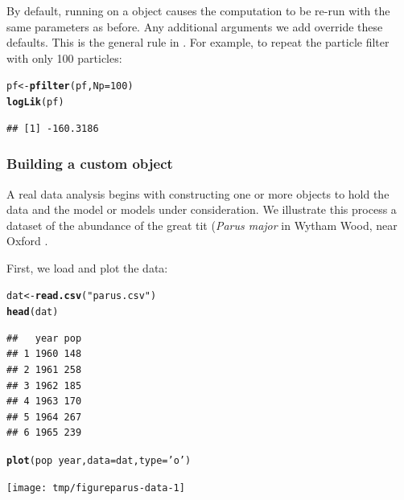 \documentclass{beamer}\usepackage[]{graphicx}\usepackage[]{color}
\makeatletter
\newcommand{\hlnum}[1]{\textcolor[rgb]{0.686,0.059,0.569}{#1}}%
\newcommand{\hlstr}[1]{\textcolor[rgb]{0.192,0.494,0.8}{#1}}%
\newcommand{\hlopt}[1]{\textcolor[rgb]{0,0,0}{#1}}%
\newcommand{\hlstd}[1]{\textcolor[rgb]{0.345,0.345,0.345}{#1}}%
\newcommand{\hlkwb}[1]{\textcolor[rgb]{0.69,0.353,0.396}{#1}}%
\newcommand{\hlkwc}[1]{\textcolor[rgb]{0.333,0.667,0.333}{#1}}%
\newcommand{\hlkwd}[1]{\textcolor[rgb]{0.737,0.353,0.396}{\textbf{#1}}}%
\newenvironment{kframe}{%
 \def\at@end@of@kframe{}%
 \ifinner\ifhmode%
  \def\at@end@of@kframe{\end{minipage}}%
  \begin{minipage}{\columnwidth}%
 \fi\fi%
 \def\FrameCommand##1{\hskip\@totalleftmargin \hskip-\fboxsep
 \colorbox{shadecolor}{##1}\hskip-\fboxsep
     \hskip-\linewidth \hskip-\@totalleftmargin \hskip\columnwidth}%
 \MakeFramed {\advance\hsize-\width
   \@totalleftmargin\z@ \linewidth\hsize
   \@setminipage}}%
 {\par\unskip\endMakeFramed%
 \at@end@of@kframe}
\newenvironment{knitrout}{}{} %
\makeatother
\begin{document}
\begin{frame}[fragile]
\item By default, running  on a  object causes the computation to be re-run with the same parameters as before.
Any additional arguments we add override these defaults.
This is the general rule in .
For example, to repeat the particle filter with only 100 particles:
\ei
\begin{knitrout}\small
{}\color{fgcolor}\begin{kframe}
\begin{alltt}
\hlstd{pf} \hlkwb{<-} \hlkwd{pfilter}\hlstd{(pf,}\hlkwc{Np}\hlstd{=}\hlnum{100}\hlstd{)}
\hlkwd{logLik}\hlstd{(pf)}
\end{alltt}
\begin{verbatim}
## [1] -160.3186
\end{verbatim}
\end{kframe}
\end{knitrout}

\end{frame}    

\begin{frame}[fragile] 
\frametitle{Building a custom  object}

A real  data analysis begins with constructing one or more  objects to hold the data and the model or models under consideration.
We illustrate this process a dataset of the abundance of the great tit ({\it Parus major} in Wytham Wood, near Oxford \citep{mccleery91}.

First, we load and plot the data:
\begin{knitrout}\small
{}\color{fgcolor}\begin{kframe}
\begin{alltt}
\hlstd{dat} \hlkwb{<-} \hlkwd{read.csv}\hlstd{(}\hlstr{"parus.csv"}\hlstd{)}
\hlkwd{head}\hlstd{(dat)}
\end{alltt}
\begin{verbatim}
##   year pop
## 1 1960 148
## 2 1961 258
## 3 1962 185
## 4 1963 170
## 5 1964 267
## 6 1965 239
\end{verbatim}
\begin{alltt}
\hlkwd{plot}\hlstd{(pop}\hlopt{~}\hlstd{year,}\hlkwc{data}\hlstd{=dat,}\hlkwc{type}\hlstd{=}\hlstr{'o'}\hlstd{)}
\end{alltt}
\end{kframe}

{\centering \texttt{[image: tmp/figureparus-data-1]} 

}



\end{knitrout}

\end{frame}
\end{document}
